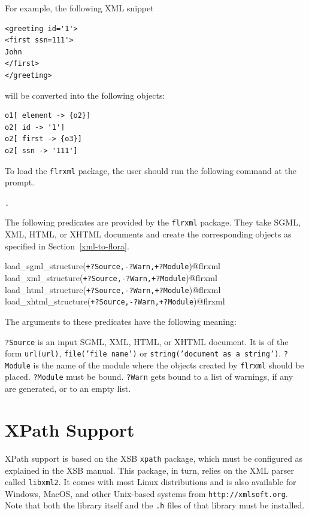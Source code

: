 For example, the following XML snippet

\begin{verbatim}
<greeting id='1'>
<first ssn=111'>
John
</first>
</greeting>
\end{verbatim}

will be converted into the following \FLSYSTEM objects:

\begin{verbatim}
o1[ element -> {o2}]
o2[ id -> '1']
o2[ first -> {o3}]
o2[ ssn -> '111']
\end{verbatim}

To load the {\tt flrxml} package, the user should run the
following command at the \FLSYSTEM prompt.

\begin{alltt}
  \prompt [flrxml]. 
\end{alltt}

The following predicates are provided by the {\tt flrxml} package.  They
take SGML, XML, HTML, or XHTML documents and create the corresponding
\FLSYSTEM objects as specified in Section~\ref{xml-to-flora}.

\begin{description}
\item [load\_sgml\_structure({\tt +?Source,-?Warn,+?Module})@flrxml]
\item[load\_xml\_structure({\tt +?Source,-?Warn,+?Module})@flrxml]
\item[load\_html\_structure({\tt +?Source,-?Warn,+?Module})@flrxml]
\item[load\_xhtml\_structure({\tt +?Source,-?Warn,+?Module})@flrxml]
\end{description}
The arguments to these predicates have the following meaning:

{\tt ?Source} is an input SGML, XML, HTML, or XHTML document.
It is of the form {\tt url({\tt {url}})},
{\tt file('{\tt {file name}}')} or {\tt string('{\tt document as a string}')}. 
{\tt ?Module} is the name of the \FLSYSTEM module where the objects created
by {\tt flrxml}  should be placed. {\tt ?Module}  must be bound.
{\tt ?Warn} gets bound to a list of warnings, if any are generated, or to
an empty list.
  

\section{XPath Support}

XPath support is based on the XSB {\tt xpath} package, which must be
configured as explained in the XSB manual. This package, in turn, relies on
the XML parser called {\tt libxml2}. It comes with most Linux
distributions and is also available for Windows, MacOS, and other
Unix-based systems from {\tt http://xmlsoft.org}. 
Note that both the library itself and the {\tt .h} files of that
library must be installed. 

